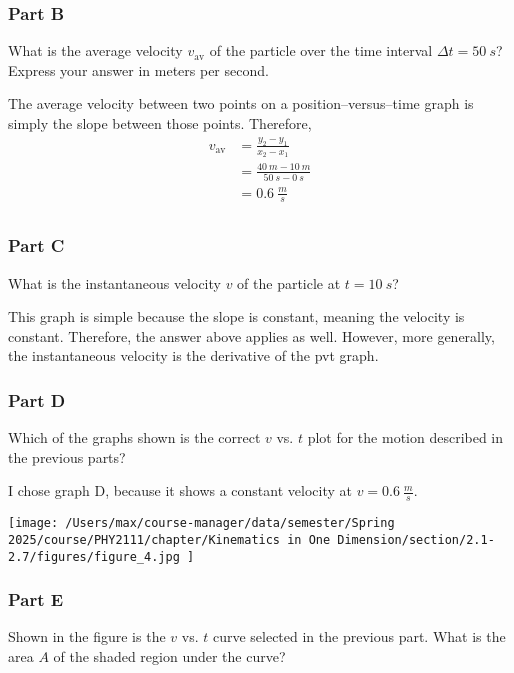 \subsubsection{Part B}
What is the average velocity $v_{\mathrm{av}}$ of the particle over the time interval $\Delta t=\SI{50}{s}$?
Express your answer in meters per second.

\begin{solution}
	The average velocity between two points on a position--versus--time graph is simply the slope between those points. Therefore,
	\begin{align*}
		v_{\mathrm{av}} &= \frac{y_2-y_1}{x_2-x_1} \\
		&= \frac{\SI{40}{m} - \SI{10}{m}}{\SI{50}{s}-\SI{0}{s}} \\
		&= \boxed{\SI{0.6}{\frac{m}{s}}} \\
	\end{align*}
\end{solution}

\subsubsection{Part C}
What is the instantaneous velocity $v$ of the particle at $t=\SI{10}{s}$?

\begin{solution}
	This graph is simple because the slope is constant, meaning the velocity is constant. Therefore, the answer above applies as well. However, more generally, the instantaneous velocity is the derivative of the pvt graph.
\end{solution}

\subsubsection{Part D}
Which of the graphs shown is the correct $v$ vs. $t$ plot for the motion described in the previous parts?

\begin{solution}
	I chose graph D, because it shows a constant velocity at $v=\SI{0.6}{\frac{m}{s}}$.
	\begin{center}
		\texttt{[image: /Users/max/course-manager/data/semester/Spring 2025/course/PHY2111/chapter/Kinematics in One Dimension/section/2.1-2.7/figures/figure\_4.jpg
		]}
	\end{center}
\end{solution}

\subsubsection{Part E}
Shown in the figure is the $v$ vs. $t$ curve selected in the previous part. What is the area $A$ of the shaded region under the curve?

